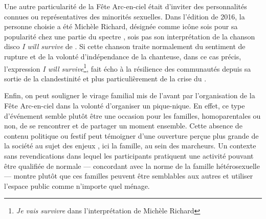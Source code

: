 Une autre particularité de la Fête Arc-en-ciel était d'inviter des personnalités connues ou représentatives des minorités sexuelles.
Dans l'édition de 2016, la personne choisie a été Michèle Richard, désignée comme icône sois pour sa popularité chez une partie du spectre \lgbt{}, sois pas son interprétation de la chanson disco \emph{I will survive} de .
Si cette chanson traite normalement du sentiment de rupture et de la volonté d'indépendance de la chanteuse, dans ce cas précis, l'expression \emph{I will survive}\footnote{\emph{Je vais survivre} dans l'interprétation de Michèle Richard}, fait écho à la résilience des communautés \lgbt depuis sa sortie de la clandestinité et plus particulièrement de la crise du \vih{}.

Enfin, on peut souligner le virage familial mis de l'avant par l'organisation de la Fête Arc-en-ciel dans la volonté d'organiser un pique-nique.
En effet, ce type d'événement semble plutôt être une occasion pour les familles, homoparentales ou non, de se rencontrer et de partager un moment ensemble.
Cette absence de contenu politique ou festif peut témoigner d'une ouverture perçue plus grande de la société au sujet des enjeux \lgbt, ici la famille, au sein des marcheurs.
Un contexte sans revendications dans lequel les participants pratiquent une activité pouvant être qualifiée de normale --- concordant avec la norme de la famille hétérosexuelle --- montre plutôt que ces familles peuvent être semblables aux autres et utiliser l'espace public comme n'importe quel ménage.

